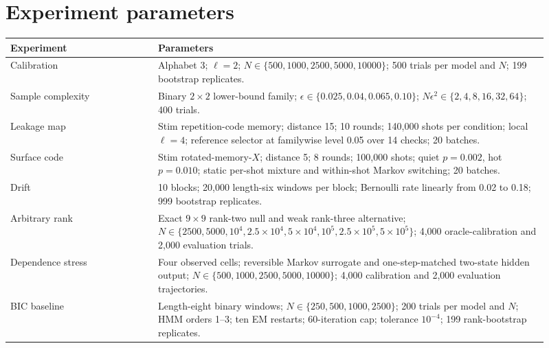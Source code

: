 \documentclass[11pt]{article}
\begin{document}
\section{Experiment parameters}
\begin{table}[H]
\centering
\small
\begin{tabular}{p{0.25\linewidth}p{0.66\linewidth}}
\toprule
Experiment & Parameters \\
\midrule
Calibration & Alphabet 3; $\ell=2$; $N\in\{500,1000,2500,5000,10000\}$; 500 trials per model and $N$; 199 bootstrap replicates.\\
Sample complexity & Binary $2\times2$ lower-bound family; $\epsilon\in\{0.025,0.04,0.065,0.10\}$; $N\epsilon^2\in\{2,4,8,16,32,64\}$; 400 trials.\\
Leakage map & Stim repetition-code memory; distance 15; 10 rounds; 140,000 shots per condition; local $\ell=4$; reference selector at familywise level 0.05 over 14 checks; 20 batches.\\
Surface code & Stim rotated-memory-$X$; distance 5; 8 rounds; 100,000 shots; quiet $p=0.002$, hot $p=0.010$; static per-shot mixture and within-shot Markov switching; 20 batches.\\
Drift & 10 blocks; 20,000 length-six windows per block; Bernoulli rate linearly from 0.02 to 0.18; 999 bootstrap replicates.\\
Arbitrary rank & Exact $9\times9$ rank-two null and weak rank-three alternative; $N\in\{2500,5000,10^4,2.5\times10^4,5\times10^4,10^5,2.5\times10^5,5\times10^5\}$; 4,000 oracle-calibration and 2,000 evaluation trials.\\
Dependence stress & Four observed cells; reversible Markov surrogate and one-step-matched two-state hidden output; $N\in\{500,1000,2500,5000,10000\}$; 4,000 calibration and 2,000 evaluation trajectories.\\
BIC baseline & Length-eight binary windows; $N\in\{250,500,1000,2500\}$; 200 trials per model and $N$; HMM orders 1--3; ten EM restarts; 60-iteration cap; tolerance $10^{-4}$; 199 rank-bootstrap replicates.\\
\bottomrule
\end{tabular}
\end{table}

\printbibliography
\end{document}
